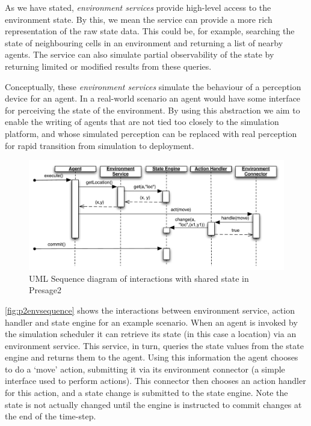 As we have stated, \emph{environment services} provide high-level access to
the environment state. By this, we mean the service can provide a more rich
representation of the raw state data. This could be, for example, searching
the state of neighbouring cells in an environment and returning a list of
nearby agents. The service can also simulate partial observability of the
state by returning limited or modified results from these queries.

Conceptually, these \emph{environment services} simulate the behaviour of a
perception device for an agent. In a real-world scenario an agent would have
some interface for perceiving the state of the environment. By using this
abstraction we aim to enable the writing of agents that are not tied too closely
to the simulation platform, and whose simulated perception can be
replaced with real perception for rapid transition from simulation to
deployment.

\begin{figure}
\includegraphics[width=\linewidth]{gfx/presage2/environment_sequence}
\caption{UML Sequence diagram of interactions with shared state in Presage2}\label{fig:p2envsequence}
\end{figure}

\autoref{fig:p2envsequence} shows the interactions between environment
service, action handler and state engine for an example scenario. When an
agent is invoked by the simulation scheduler it can retrieve its state (in
this case a location) via an environment service. This service, in turn,
queries the state values from the state engine and returns them to the agent.
Using this information the agent chooses to do a `move' action, submitting it
via its environment connector (a simple interface used to perform actions).
This connector then chooses an action handler for this action, and a state
change is submitted to the state engine. Note the state is not actually
changed until the engine is instructed to commit changes at the end of the
time-step.

